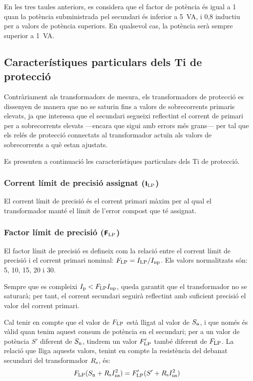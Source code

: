 En les tres taules anteriors, es considera que el factor de
potència és igual a 1 quan la potència subministrada pel secundari és inferior a \qty{5}{VA}, i 0,8 inductiu per a valors de potència superiors. En qualsevol cas, la potència serà sempre superior a \qty{1}{VA}.


\subsection{Característiques particulars dels Ti de protecció}

Contràriament als transformadors de mesura, els transformadors de
protecció es dissenyen de manera que no se saturin fins a  valors
de sobrecorrents primaris elevats, ja que interessa que el
secundari segueixi reflectint el corrent de primari per a
 sobrecorrents elevats ---encara que sigui amb errors més grans--- per
tal que els relés de protecció connectats al transformador actuïn
als valors de sobrecorrents a què estan ajustats.

Es presenten a continuació les característiques particulars dels Ti
de protecció.

\subsubsection{Corrent límit de precisió assignat (${\boldsymbol{\mathsf{I_\text{LP}}}}$)}

El corrent
límit de precisió és el corrent primari màxim per al qual el transformador manté el límit
de l'error compost que té assignat.

\subsubsection{Factor límit de precisió (${\boldsymbol{\mathsf{F_\text{LP}}}}$) }

 El factor límit de precisió
es defineix com la relació entre el corrent límit de precisió
i el corrent primari nominal: $F_\mathrm{LP} = I_\mathrm{LP} /I_\mathrm{np}$.
Els valors normalitzats són: 5, 10, 15, 20 i 30.

Sempre que es compleixi  $I_\mathrm{p}<F_\mathrm{LP} I_\mathrm{np}$, queda garantit
que el transformador no se saturarà; per tant, el corrent
secundari seguirà reflectint amb suficient precisió el valor del
corrent primari.

Cal tenir en compte que el valor de $F_\mathrm{LP}$ està lligat
 al valor de $S_\mathrm{n}$, i que només és vàlid
quan tenim aquest consum de  potència en el secundari; per a un
valor de potència $S'$ diferent de $S_\mathrm{n}$, tindrem un valor
$F'_\mathrm{LP}$ també diferent de  $F_\mathrm{LP}$. La relació que
lliga aquests valors, tenint en compte la resistència del debanat
secundari del transformador  $R_\mathrm{s}$, és:
\begin{equation}\label{eq:flp}
    F_\mathrm{LP} (S_\mathrm{n}+R_\mathrm{s}I_\mathrm{ns}^2) =
    F'_\mathrm{LP} (S'+R_\mathrm{s}I_\mathrm{ns}^2)
\end{equation}

